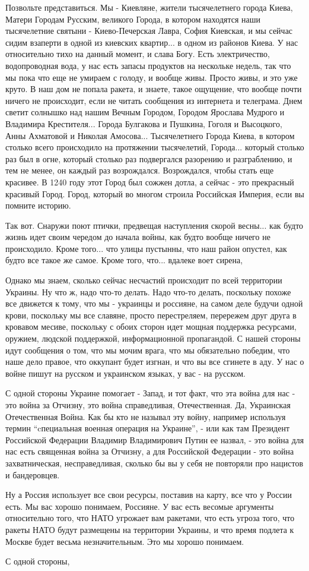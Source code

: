 Позвольте представиться. Мы - Киевляне, жители тысячелетнего города Киева,
Матери Городам Русским, великого Города, в котором находятся наши тысячелетние
святыни - Киево-Печерская Лавра, София Киевская, и мы сейчас сидим взаперти в
одной из киевских квартир... в одном из районов Киева. У нас относительно тихо
на данный момент, и слава Богу. Есть электричество, водопроводная вода, у нас
есть запасы продуктов на нескольке недель, так что мы пока что еще не умираем с
голоду, и вообще живы. Просто живы, и это уже круто. В наш дом не попала
ракета, и знаете, такое ощущение, что вообще почти ничего не происходит, если
не читать сообщения из интернета и телеграма. Днем светит солнышко над нашим
Вечным Городом, Городом Ярослава Мудрого и Владимира Крестителя... Города
Булгакова и Пушкина, Гоголя и Высоцкого, Анны Ахматовой и Николая Амосова...
Тысячелетнего Города Киева, в котором столько всего происходило на протяжении
тысячелетий, Города... который столько раз был в огне, который столько раз
подвергался разорению и разграблению, и тем не менее, он каждый раз
возрождался. Возрождался, чтобы стать еще красивее. В 1240 году этот Город был
сожжен дотла, а сейчас - это прекрасный красивый Город. Город, который во
многом строила Российская Империя, если вы помните историю.

Так вот. Снаружи поют птички, предвещая наступления скорой весны... как будто
жизнь идет своим чередом до начала войны, как будто вообще ничего не
происходило. Кроме того...  что улицы пустынны, что наш район опустел, как
будто все такое же самое. Кроме того, что... вдалеке воет сирена, 

Однако мы знаем, сколько сейчас несчастий происходит по всей территории
Украины. Ну что ж, надо что-то делать. Надо что-то делать, поскольку похоже все
движется к тому, что мы - украинцы и россияне, на самом деле будучи одной
крови, поскольку мы все славяне, просто перестреляем, перережем друг друга в
кровавом месиве, поскольку с обоих сторон идет мощная поддержка ресурсами,
оружием, людской поддержкой, информационной пропагандой. С нашей стороны идут
сообщения о том, что мы мочим врага, что мы обязательно победим, что наше дело
правое, что оккупант будет изгнан, и что вы все сгинете в аду. У нас о войне
пишут на русском и украинском языках, у вас - на русском. 

С одной стороны Украине помогает - Запад, и тот факт, что эта война для нас -
это война за Отчизну, это война справедливая, Отечественная. Да, Украинская
Отечественная Война. Как бы кто не называл эту войну, например используя термин
\enquote{cпециальная военная операция на Украине}, - или как там Президент
Российской Федерации Владимир Владимирович Путин ее назвал, - это война для нас
есть священная война за Отчизну, а для Российской Федерации - это война
захватническая, несправедливая, сколько бы вы у себя не повторяли про нацистов
и бандеровцев. 

Ну а Россия использует все свои ресурсы, поставив на карту, все что у России
есть.  Мы вас хорошо понимаем, Россияне. У вас есть весомые аргументы
относительно того, что НАТО угрожает вам ракетами, что есть угроза того, что
ракеты НАТО будут размещены на территории Украины, и что время подлета к Москве
будет весьма незначительным. Это мы хорошо понимаем. 

С одной стороны,
